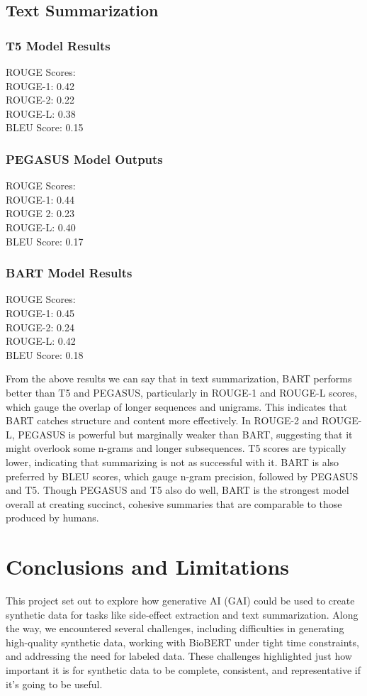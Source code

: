 \documentclass[sigplan,screen]{acmart}
\begin{document}
\subsection{Text Summarization}

\subsubsection{T5 Model Results}
ROUGE Scores:\\
ROUGE-1: 0.42\\
ROUGE-2: 0.22\\
ROUGE-L: 0.38\\
BLEU Score: 0.15

\subsubsection{PEGASUS Model Outputs}
ROUGE Scores:\\
ROUGE-1: 0.44\\
ROUGE 2: 0.23\\
ROUGE-L: 0.40\\
BLEU Score: 0.17

\subsubsection{BART Model Results}
ROUGE Scores:\\
ROUGE-1: 0.45\\
ROUGE-2: 0.24 \\
ROUGE-L: 0.42 \\
BLEU Score: 0.18

From the above results we can say that in text summarization, BART performs better than T5 and PEGASUS, particularly in ROUGE-1 and ROUGE-L scores, which gauge the overlap of longer sequences and unigrams. This indicates that BART catches structure and content more effectively. In ROUGE-2 and ROUGE-L, PEGASUS is powerful but marginally weaker than BART, suggesting that it might overlook some n-grams and longer subsequences. T5 scores are typically lower, indicating that summarizing is not as successful with it. BART is also preferred by BLEU scores, which gauge n-gram precision, followed by PEGASUS and T5. Though PEGASUS and T5 also do well, BART is the strongest model overall at creating succinct, cohesive summaries that are comparable to those produced by humans.



\section{Conclusions and Limitations} 
This project set out to explore how generative AI (GAI) could be used to create synthetic data for tasks like side-effect extraction and text summarization. Along the way, we encountered several challenges, including difficulties in generating high-quality synthetic data, working with BioBERT under tight time constraints, and addressing the need for labeled data. These challenges highlighted just how important it is for synthetic data to be complete, consistent, and representative if it’s going to be useful.
\end{document}
